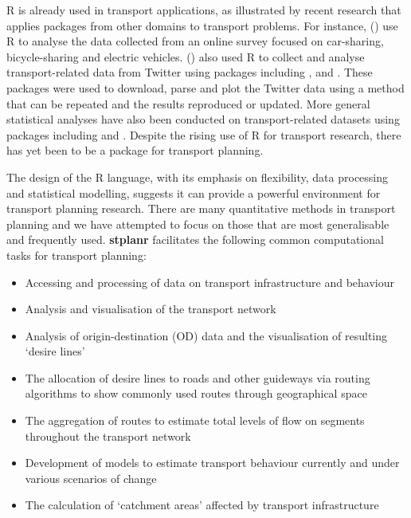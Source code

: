 R is already used in transport applications, as illustrated by recent
research that applies packages from other domains to transport problems.
For instance, \citeauthor{efthymiou_use_2012}
(\citeyear{efthymiou_use_2012}) use R to analyse the data collected from
an online survey focused on car-sharing, bicycle-sharing and electric
vehicles. \citeauthor{efthymiou_use_2012}
(\citeyear{efthymiou_use_2012}) also used R to collect and analyse
transport-related data from Twitter using packages including
,  and . These packages
were used to download, parse and plot the Twitter data using a method
that can be repeated and the results reproduced or updated. More general
statistical analyses have also been conducted on transport-related
datasets using packages including  and 
\citep{diana_studying_2012,cerin_walking_2013}. Despite the rising use
of R for transport research, there has yet been to be a package for
transport planning.

The design of the R language, with its emphasis on flexibility, data
processing and statistical modelling, suggests it can provide a powerful
environment for transport planning research. There are many quantitative
methods in transport planning \citep{ortuzar_modelling_2001} and we have
attempted to focus on those that are most generalisable and frequently
used. \textbf{stplanr} facilitates the following common computational
tasks for transport planning:

\begin{itemize}
\tightlist
\item
  Accessing and processing of data on transport infrastructure and
  behaviour
\item
  Analysis and visualisation of the transport network
\item
  Analysis of origin-destination (OD) data and the visualisation of
  resulting `desire lines'
\item
  The allocation of desire lines to roads and other guideways via
  routing algorithms to show commonly used routes through geographical
  space
\item
  The aggregation of routes to estimate total levels of flow on segments
  throughout the transport network
\item
  Development of models to estimate transport behaviour currently and
  under various scenarios of change
\item
  The calculation of `catchment areas' affected by transport
  infrastructure
\end{itemize}

